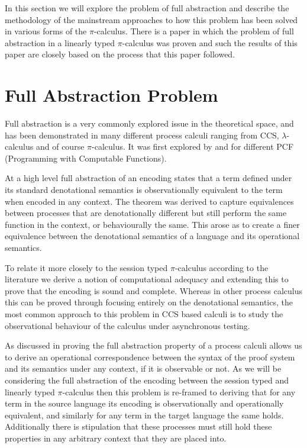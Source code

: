 
In this section we will explore the problem of full abstraction and describe the methodology of the mainstream approaches to how this problem has been solved in various forms of the $\pi$-calculus. There is a paper \citep{demangeon2011full} in which the problem of full abstraction in a linearly typed $\pi$-calculus was proven and such the results of this paper are closely based on the process that this paper followed. 

\section{Full Abstraction Problem}\label{FullAbsProblem}

Full abstraction is a very commonly explored issue in the theoretical space, and has been demonstrated in many different process calculi ranging from CCS, $\lambda$-calculus and of course $\pi$-calculus. It was first explored by \citep{MILNER19771} and \citep{PLOTKIN1977223} for different PCF (Programming with Computable Functions). 

At a high level full abstraction of an encoding states that a term defined under its standard denotational semantics is observationally equivalent to the term when encoded in any context. The theorem was derived to capture equivalences between processes that are denotationally different but still perform the same function in the context, or behaviourally the same. This arose \cite{PLOTKIN1977223} as to create a finer equivalence between the denotational semantics of a language and its operational semantics. 

To relate it more closely to the session typed $\pi$-calculus according to the literature \cite{demangeon2011full} \cite{MILNER19771} we derive a notion of computational adequacy and extending this to prove that the encoding is sound and complete. Whereas in other process calculus this can be proved through focusing entirely on the denotational semantics, the most common approach to this problem in CCS based calculi is to study the observational behaviour of the calculus under asynchronous testing. 

As discussed in \citep{curien2007definability} proving the full abstraction property of a process calculi allows us to derive an operational correspondence between the syntax of the proof system and its semantics under any context, if it is observable or not. As we will be considering the full abstraction of the encoding between the session typed and linearly typed $\pi$-calculus then this problem is re-framed to deriving that for any term in the source language its encoding is observationally and operationally equivalent, and similarly for any term in the target language the same holds. Additionally there is stipulation that these processes must still hold these properties in any arbitrary context that they are placed into.

